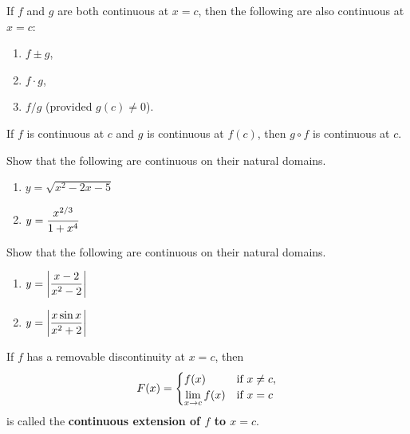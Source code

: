 \vfill

\begin{theorem}
If $f$ and $g$ are both continuous at $x=c$, then the following are also continuous at $x=c$:
\begin{enumerate}
\item $f\pm g$,
\item $f\cdot g$,
\item $f/g$ (provided $g(c)\ne 0$).
\end{enumerate}
\end{theorem}

\begin{theorem}
If $f$ is continuous at $c$ and $g$ is continuous at $f(c)$, then $g\circ f$ is continuous at $c$.
\end{theorem}

\newpage

\begin{example}
Show that the following are continuous on their natural domains.
\begin{enumerate}
\item $y=\sqrt{x^2-2x-5}$
\vfill
\item $y=\displaystyle\frac{x^{2/3}}{1+x^4}$
\vfill
\end{enumerate}
\end{example}

\newpage

\begin{example}
Show that the following are continuous on their natural domains.
\begin{enumerate}
\item $y=\displaystyle\left|\frac{x-2}{x^2-2}\right|$
\vfill
\item $y=\displaystyle\left|\frac{x\sin x}{x^2+2}\right|$
\vfill
\end{enumerate}
\end{example}

\newpage

\begin{definition}
If $f$ has a removable discontinuity at $x=c$, then
\begin{equation*}
F(x) = \begin{cases}
f(x) & \text{if }x\ne c,\\
\displaystyle\lim_{x\to c}f(x) & \text{if } x=c
\end{cases}
\end{equation*}
is called the \textbf{continuous extension of $f$ to $x=c$}.
\end{definition}

